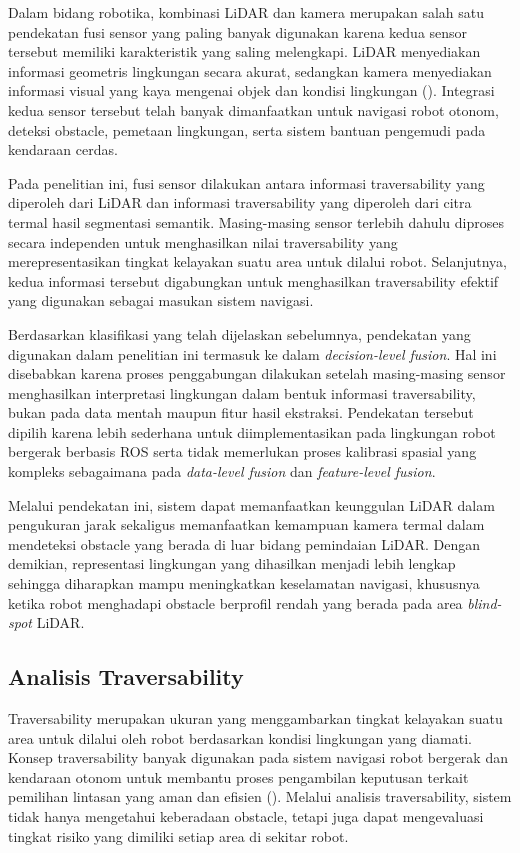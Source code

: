 Dalam bidang robotika, kombinasi LiDAR dan kamera merupakan salah satu pendekatan fusi sensor yang paling banyak digunakan karena kedua sensor tersebut memiliki karakteristik yang saling melengkapi. LiDAR menyediakan informasi geometris lingkungan secara akurat, sedangkan kamera menyediakan informasi visual yang kaya mengenai objek dan kondisi lingkungan (\cite{Choi2023,Schichler2025}). Integrasi kedua sensor tersebut telah banyak dimanfaatkan untuk navigasi robot otonom, deteksi obstacle, pemetaan lingkungan, serta sistem bantuan pengemudi pada kendaraan cerdas.

Pada penelitian ini, fusi sensor dilakukan antara informasi traversability yang diperoleh dari LiDAR dan informasi traversability yang diperoleh dari citra termal hasil segmentasi semantik. Masing-masing sensor terlebih dahulu diproses secara independen untuk menghasilkan nilai traversability yang merepresentasikan tingkat kelayakan suatu area untuk dilalui robot. Selanjutnya, kedua informasi tersebut digabungkan untuk menghasilkan traversability efektif yang digunakan sebagai masukan sistem navigasi.

Berdasarkan klasifikasi yang telah dijelaskan sebelumnya, pendekatan yang digunakan dalam penelitian ini termasuk ke dalam \textit{decision-level fusion}. Hal ini disebabkan karena proses penggabungan dilakukan setelah masing-masing sensor menghasilkan interpretasi lingkungan dalam bentuk informasi traversability, bukan pada data mentah maupun fitur hasil ekstraksi. Pendekatan tersebut dipilih karena lebih sederhana untuk diimplementasikan pada lingkungan robot bergerak berbasis ROS serta tidak memerlukan proses kalibrasi spasial yang kompleks sebagaimana pada \textit{data-level fusion} dan \textit{feature-level fusion}.

Melalui pendekatan ini, sistem dapat memanfaatkan keunggulan LiDAR dalam pengukuran jarak sekaligus memanfaatkan kemampuan kamera termal dalam mendeteksi obstacle yang berada di luar bidang pemindaian LiDAR. Dengan demikian, representasi lingkungan yang dihasilkan menjadi lebih lengkap sehingga diharapkan mampu meningkatkan keselamatan navigasi, khususnya ketika robot menghadapi obstacle berprofil rendah yang berada pada area \textit{blind-spot} LiDAR.

\subsection{Analisis Traversability}

Traversability merupakan ukuran yang menggambarkan tingkat kelayakan suatu area untuk dilalui oleh robot berdasarkan kondisi lingkungan yang diamati. Konsep traversability banyak digunakan pada sistem navigasi robot bergerak dan kendaraan otonom untuk membantu proses pengambilan keputusan terkait pemilihan lintasan yang aman dan efisien (\cite{Scherer2008,Howard2017}). Melalui analisis traversability, sistem tidak hanya mengetahui keberadaan obstacle, tetapi juga dapat mengevaluasi tingkat risiko yang dimiliki setiap area di sekitar robot.

